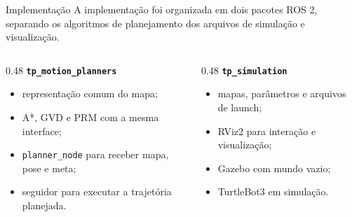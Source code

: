\documentclass[aspectratio=169]{beamer}
\begin{document}
\begin{frame}{Implementação}
    \small
    A implementação foi organizada em dois pacotes ROS 2, separando os algoritmos de planejamento dos arquivos de simulação e visualização.

    \vspace{0.25cm}
    \begin{columns}[T]
        \begin{column}{0.48\textwidth}
            \textbf{\texttt{tp\_motion\_planners}}
            \begin{itemize}
                \item representação comum do mapa;
                \item A*, GVD e PRM com a mesma interface;
                \item \texttt{planner\_node} para receber mapa, pose e meta;
                \item seguidor para executar a trajetória planejada.
            \end{itemize}
        \end{column}
        \begin{column}{0.48\textwidth}
            \textbf{\texttt{tp\_simulation}}
            \begin{itemize}
                \item mapas, parâmetros e arquivos de launch;
                \item RViz2 para interação e visualização;
                \item Gazebo com mundo vazio;
                \item TurtleBot3 em simulação.
            \end{itemize}
        \end{column}
    \end{columns}
\end{frame}
\end{document}
